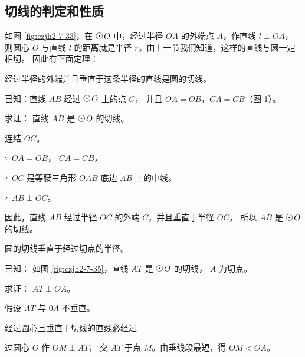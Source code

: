 \subsection{切线的判定和性质}\label{subsec:czjh2-7-8}

如图 \ref{fig:czjh2-7-33}，在 $\yuan\,O$ 中，经过半径 $OA$ 的外端点 $A$，作直线 $l \perp OA$，
则圆心 $O$ 与直线 $l$ 的距离就是半径 $r$。由上一节我们知道，这样的直线与圆一定相切。
因此有下面定理：

\begin{dingli}[切线的判定定理]
    经过半径的外端并且垂直于这条半径的直线是圆的切线。
\end{dingli}

\begin{figure}[htbp]
    \centering
    \begin{minipage}[b]{7cm}
        \centering
        
        \caption{}\label{fig:czjh2-7-33}
    \end{minipage}
    \qquad
    \begin{minipage}[b]{7cm}
        \centering
        
        \caption{}\label{fig:czjh2-7-34}
    \end{minipage}
\end{figure}

\liti 已知：直线 $AB$ 经过 $\yuan\,O$ 上的点 $C$， 并且 $OA = OB$，$CA = CB$（图 \ref{fig:czjh2-7-34}）。

求证： 直线 $AB$ 是 $\yuan\,O$ 的切线。

\zhengming 连结 $OC$。

$\because$ \quad $OA = OB$， $CA = CB$，

$\therefore$ \quad $OC$ 是等腰三角形 $OAB$ 底边 $AB$ 上的中线。

$\therefore$ \quad $AB \perp OC$。

因此，直线 $AB$ 经过半径 $OC$ 的外端 $C$，并且垂直于半径 $OC$， 所以 $AB$ 是 $\yuan\,O$ 的切线。


\begin{dingli}[切线的性质定理]
    圆的切线垂直于经过切点的半径。
\end{dingli}


已知： 如图 \ref{fig:czjh2-7-35}，直线 $AT$ 是 $\yuan\,O$ 的切线， $A$ 为切点。

求证： $AT \perp OA$。

\zhengming 假设 $AT$ 与 $0A$ 不垂直。

经过圆心且垂直于切线的直线必经过

过圆心 $O$ 作 $OM \perp AT$， 交 $AT$ 于点 $M$。由垂线段最短，得 $OM < OA$。

